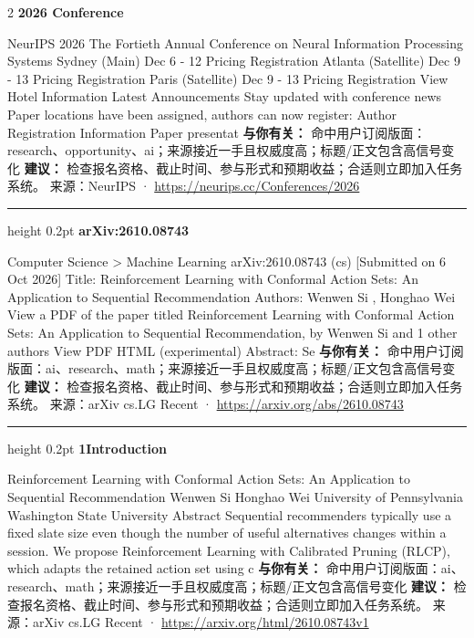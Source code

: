 \documentclass[10.5pt]{ctexart}
\begin{document}
\begin{multicols}{2}
{\large\bfseries 2026 Conference}\par
NeurIPS 2026 The Fortieth Annual Conference on Neural Information Processing Systems Sydney (Main) Dec 6 - 12 Pricing Registration Atlanta (Satellite) Dec 9 - 13 Pricing Registration Paris (Satellite) Dec 9 - 13 Pricing Registration View Hotel Information Latest Announcements Stay updated with conference news Paper locations have been assigned, authors can now register: Author Registration Information Paper presentat
\textbf{与你有关：} 命中用户订阅版面：research、opportunity、ai；来源接近一手且权威度高；标题/正文包含高信号变化
\textbf{建议：} 检查报名资格、截止时间、参与形式和预期收益；合适则立即加入任务系统。
{\footnotesize\color{ormuted} 来源：NeurIPS · \url{https://neurips.cc/Conferences/2026}}
\vspace{2mm}
\hrule height 0.2pt
\vspace{2mm}
{\large\bfseries arXiv:2610.08743}\par
Computer Science > Machine Learning arXiv:2610.08743 (cs) [Submitted on 6 Oct 2026] Title: Reinforcement Learning with Conformal Action Sets: An Application to Sequential Recommendation Authors: Wenwen Si , Honghao Wei View a PDF of the paper titled Reinforcement Learning with Conformal Action Sets: An Application to Sequential Recommendation, by Wenwen Si and 1 other authors View PDF HTML (experimental) Abstract: Se
\textbf{与你有关：} 命中用户订阅版面：ai、research、math；来源接近一手且权威度高；标题/正文包含高信号变化
\textbf{建议：} 检查报名资格、截止时间、参与形式和预期收益；合适则立即加入任务系统。
{\footnotesize\color{ormuted} 来源：arXiv cs.LG Recent · \url{https://arxiv.org/abs/2610.08743}}
\vspace{2mm}
\hrule height 0.2pt
\vspace{2mm}
{\large\bfseries 1Introduction}\par
Reinforcement Learning with Conformal Action Sets: An Application to Sequential Recommendation Wenwen Si Honghao Wei University of Pennsylvania Washington State University Abstract Sequential recommenders typically use a fixed slate size even though the number of useful alternatives changes within a session. We propose Reinforcement Learning with Calibrated Pruning (RLCP), which adapts the retained action set using c
\textbf{与你有关：} 命中用户订阅版面：ai、research、math；来源接近一手且权威度高；标题/正文包含高信号变化
\textbf{建议：} 检查报名资格、截止时间、参与形式和预期收益；合适则立即加入任务系统。
{\footnotesize\color{ormuted} 来源：arXiv cs.LG Recent · \url{https://arxiv.org/html/2610.08743v1}}

\end{multicols}
\end{document}
